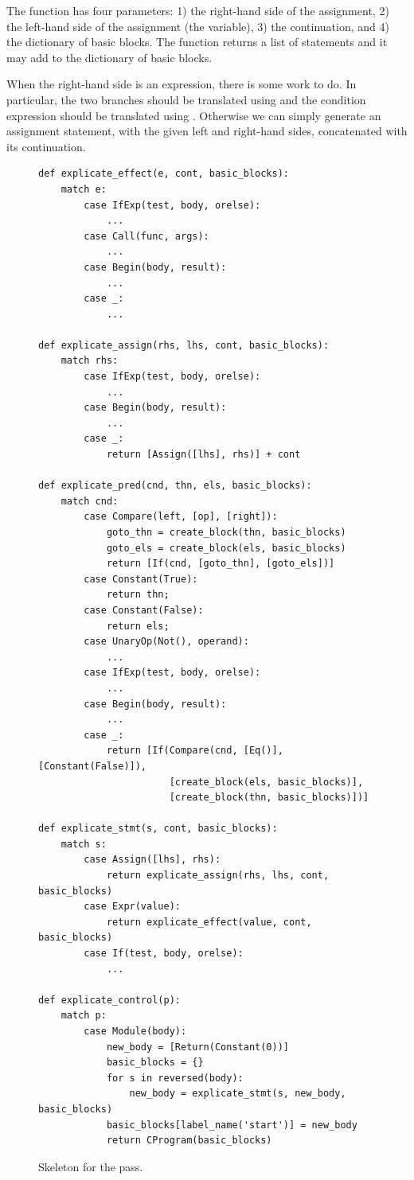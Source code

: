\documentclass[7x10]{TimesAPriori_MIT}%
\numberwithin{theorem}{chapter}
\numberwithin{definition}{chapter}
\numberwithin{equation}{chapter}
\begin{document}
{The  function has four parameters: 1) the
right-hand side of the assignment, 2) the left-hand side of the
assignment (the variable), 3) the continuation, and 4) the dictionary
of basic blocks. The  function returns a list
of \LangCIf{} statements and it may add to the dictionary of basic
blocks.

When the right-hand side is an  expression, there is some
work to do. In particular, the two branches should be translated using
 and the condition expression should be
translated using .  Otherwise we can simply
generate an assignment statement, with the given left and right-hand
sides, concatenated with its continuation.

\begin{figure}[tbp]
\begin{tcolorbox}[colback=white]
\begin{lstlisting}[basicstyle=\ttfamily\footnotesize]
def explicate_effect(e, cont, basic_blocks):
    match e:
        case IfExp(test, body, orelse):
            ...
        case Call(func, args):
            ...
        case Begin(body, result):
            ...
        case _:
            ...

def explicate_assign(rhs, lhs, cont, basic_blocks):
    match rhs:
        case IfExp(test, body, orelse):
            ...
        case Begin(body, result):
            ...
        case _:
            return [Assign([lhs], rhs)] + cont

def explicate_pred(cnd, thn, els, basic_blocks):
    match cnd:
        case Compare(left, [op], [right]):
            goto_thn = create_block(thn, basic_blocks)
            goto_els = create_block(els, basic_blocks)
            return [If(cnd, [goto_thn], [goto_els])]
        case Constant(True):
            return thn;
        case Constant(False):
            return els;
        case UnaryOp(Not(), operand):
            ...
        case IfExp(test, body, orelse):
            ...
        case Begin(body, result):
            ...
        case _:
            return [If(Compare(cnd, [Eq()], [Constant(False)]),
                       [create_block(els, basic_blocks)],
                       [create_block(thn, basic_blocks)])]

def explicate_stmt(s, cont, basic_blocks):
    match s:
        case Assign([lhs], rhs):
            return explicate_assign(rhs, lhs, cont, basic_blocks)
        case Expr(value):
            return explicate_effect(value, cont, basic_blocks)
        case If(test, body, orelse):
            ...

def explicate_control(p):
    match p:
        case Module(body):
            new_body = [Return(Constant(0))]
            basic_blocks = {}
            for s in reversed(body):
                new_body = explicate_stmt(s, new_body, basic_blocks)
            basic_blocks[label_name('start')] = new_body
            return CProgram(basic_blocks)
\end{lstlisting}
\end{tcolorbox}
\caption{Skeleton for the  pass.}
\label{fig:explicate-control-Lif}
\end{figure}
\fi}
\end{document}
